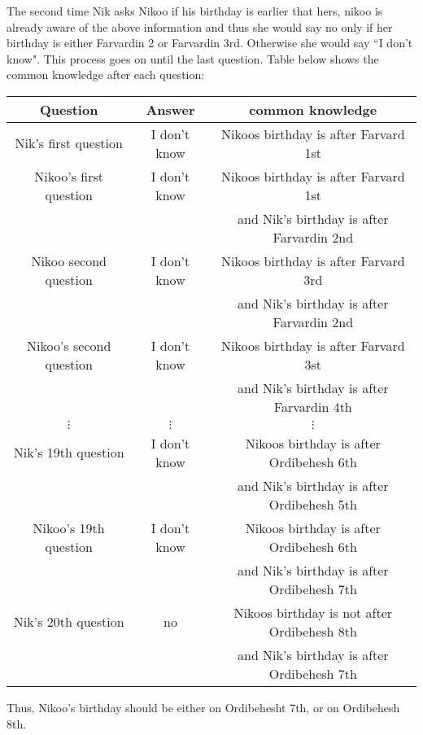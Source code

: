 \begin{solution}
The second time Nik asks Nikoo if his birthday is earlier that hers, nikoo is already aware of the above information and thus she would say no only if her birthday is either Farvardin 2 or Farvardin 3rd. Otherwise she would say ``I don't know".  This process goes on until the last question. Table below shows the common knowledge after each question:
\begin{center}
	\begin{tabular}{|c|c|c|}
		\hline
		Question & Answer & common knowledge\\
		\hline
		Nik's first question & I don't know & Nikoos birthday is after Farvard 1st \\
		\hline 
		Nikoo's first question & I don't know & Nikoos birthday is after Farvard 1st\\
		& &  and Nik's birthday is after Farvardin 2nd \\
		\hline
		Nikoo second question & I don't know & Nikoos birthday is after Farvard 3rd\\
		& &  and Nik's birthday is after Farvardin 2nd \\
		\hline
		Nikoo's second question & I don't know & Nikoos birthday is after Farvard 3st\\
		& &  and Nik's birthday is after Farvardin 4th \\
		\hline
		$\vdots$ & $\vdots$ & $\vdots$ \\
		\hline
		Nik's 19th question & I don't know & Nikoos birthday is after Ordibehesh 6th\\
		& &  and Nik's birthday is after Ordibehesh 5th \\
		\hline
		Nikoo's 19th question & I don't know & Nikoos birthday is after Ordibehesh 6th \\
		& &  and Nik's birthday is after Ordibehesh 7th \\
		\hline
		Nik's 20th question & no & Nikoos birthday is not after Ordibehesh 8th\\
		& &  and Nik's birthday is after Ordibehesh 7th \\
		\hline
	\end{tabular}
\end{center}
Thus, Nikoo's birthday should be either on Ordibehesht 7th, or on Ordibehesh 8th.
\end{solution}
